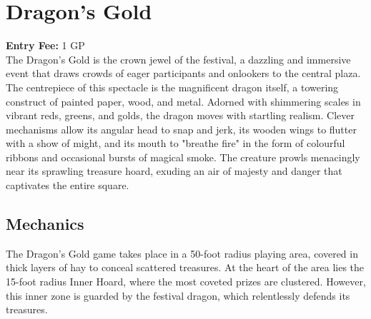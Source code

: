 \section*{Dragon's Gold}
\textbf{Entry Fee:} 1 GP\\
{\entryfont The Dragon's Gold is the crown jewel of the festival, a dazzling and immersive event that draws crowds of eager participants and onlookers to the central plaza. The centrepiece of this spectacle is the magnificent dragon itself, a towering construct of painted paper, wood, and metal. Adorned with shimmering scales in vibrant reds, greens, and golds, the dragon moves with startling realism. Clever mechanisms allow its angular head to snap and jerk, its wooden wings to flutter with a show of might, and its mouth to "breathe fire" in the form of colourful ribbons and occasional bursts of magical smoke. The creature prowls menacingly near its sprawling treasure hoard, exuding an air of majesty and danger that captivates the entire square.}

\subsection*{Mechanics}
{\entryfont The Dragon's Gold game takes place in a 50-foot radius playing area, covered in thick layers of hay to conceal scattered treasures. At the heart of the area lies the 15-foot radius Inner Hoard, where the most coveted prizes are clustered. However, this inner zone is guarded by the festival dragon, which relentlessly defends its treasures.}



